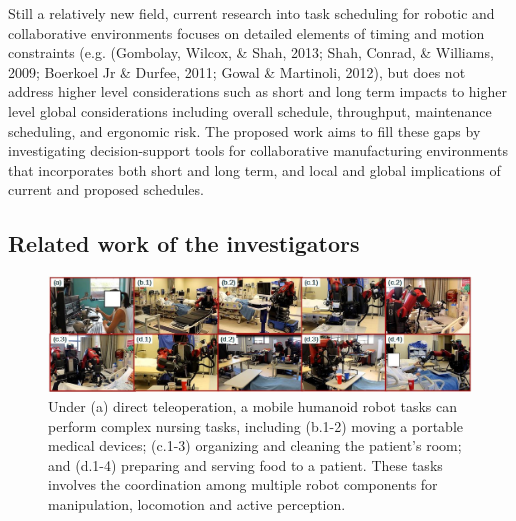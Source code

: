 Still a relatively new field, current research into task scheduling for robotic and collaborative environments focuses on detailed elements of timing and motion constraints (e.g. (Gombolay, Wilcox, \& Shah, 2013; Shah, Conrad, \& Williams, 2009; Boerkoel Jr \& Durfee, 2011; Gowal \& Martinoli, 2012), but does not address higher level considerations such as short and long term impacts to higher level global considerations including overall schedule, throughput, maintenance scheduling, and ergonomic risk. The proposed work aims to fill these gaps by investigating decision-support tools for collaborative manufacturing environments that incorporates both short and long term, and local and global implications of current and proposed schedules.


\subsection{Related work of the investigators}

\begin{figure}[h!!]
\centering
\includegraphics[width=0.99\linewidth]{fig//NursingTask}
\caption{Under (a) direct teleoperation, a mobile humanoid robot tasks can perform complex nursing tasks, including (b.1-2) moving a portable medical devices; (c.1-3) organizing and cleaning the patient's room; and (d.1-4) preparing and serving food to a patient. These tasks involves the coordination among multiple robot components for manipulation, locomotion and active perception.}
\label{Tasks}
\vspace{1ex}
\end{figure}

